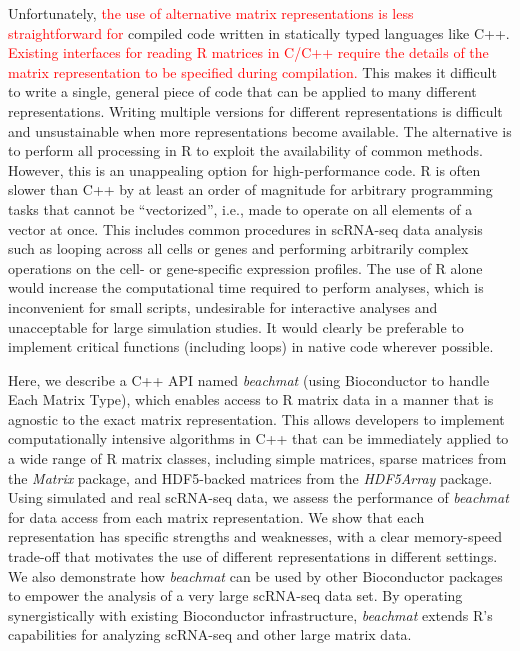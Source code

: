 \documentclass[10pt,letterpaper]{article}
\newcommand{\beachmat}{\textit{beachmat}}
\newcommand{\revised}[1]{\textcolor{red}{#1}}
\begin{document}
Unfortunately, \revised{the use of alternative matrix representations is less straightforward for} compiled code written in statically typed languages like C++.
\revised{Existing interfaces for reading R matrices in C/C++ require the details of the matrix representation to be specified during compilation.}
This makes it difficult to write a single, general piece of code that can be applied to many different representations.
Writing multiple versions for different representations is difficult and unsustainable when more representations become available.
The alternative is to perform all processing in R to exploit the availability of common methods.
However, this is an unappealing option for high-performance code.
R is often slower than C++ by at least an order of magnitude for arbitrary programming tasks that cannot be ``vectorized'', i.e., made to operate on all elements of a vector at once.
This includes common procedures in scRNA-seq data analysis such as looping across all cells or genes and performing arbitrarily complex operations on the cell- or gene-specific expression profiles.
The use of R alone would increase the computational time required to perform analyses, which is inconvenient for small scripts, undesirable for interactive analyses and unacceptable for large simulation studies.
It would clearly be preferable to implement critical functions (including loops) in native code wherever possible.


Here, we describe a C++ API named \beachmat{} (using Bioconductor to handle Each Matrix Type), which enables access to R matrix data in a manner that is agnostic to the exact matrix representation.
This allows developers to implement computationally intensive algorithms in C++ that can be immediately applied to a wide range of R matrix classes, including simple matrices, sparse matrices from the \textit{Matrix} package, and HDF5-backed matrices from the \textit{HDF5Array} package.
Using simulated and real scRNA-seq data, we assess the performance of \beachmat{} for data access from each matrix representation.
We show that each representation has specific strengths and weaknesses, with a clear memory-speed trade-off that motivates the use of different representations in different settings.
We also demonstrate how \beachmat{} can be used by other Bioconductor packages to empower the analysis of a very large scRNA-seq data set. 
By operating synergistically with existing Bioconductor infrastructure, \beachmat{} extends R's capabilities for analyzing scRNA-seq and other large matrix data.
\end{document}
